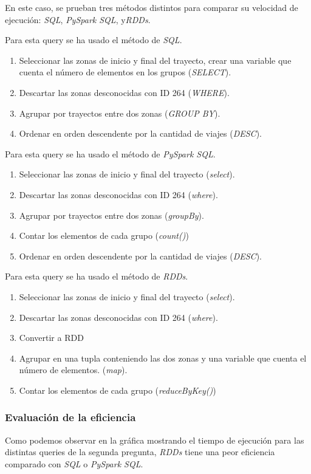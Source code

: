En este caso, se prueban tres métodos distintos para comparar su velocidad de ejecución: \textit{SQL}, \textit{ PySpark SQL}, y\textit{RDDs}.

Para esta query se ha usado el método de \textit{SQL}. 
\begin{enumerate}
  \item Seleccionar las zonas de inicio y final del trayecto, crear una variable que cuenta el número de elementos en los grupos (\textit{SELECT}).
  \item Descartar las zonas desconocidas con ID 264 (\textit{WHERE}).
  \item Agrupar por trayectos entre dos zonas (\textit{GROUP BY}).
  \item Ordenar en orden descendente por la cantidad de viajes (\textit{DESC}).
\end{enumerate}

Para esta query se ha usado el método de \textit{PySpark SQL}. 
\begin{enumerate}
  \item Seleccionar las zonas de inicio y final del trayecto (\textit{select}).
  \item Descartar las zonas desconocidas con ID 264 (\textit{where}).
  \item Agrupar por trayectos entre dos zonas (\textit{groupBy}).
  \item Contar los elementos de cada grupo (\textit{count()})
  \item Ordenar en orden descendente por la cantidad de viajes (\textit{DESC}).
\end{enumerate}

Para esta query se ha usado el método de \textit{RDDs}. 
\begin{enumerate}
  \item Seleccionar las zonas de inicio y final del trayecto (\textit{select}).
  \item Descartar las zonas desconocidas con ID 264 (\textit{where}).
  \item Convertir a RDD
  \item Agrupar en una tupla conteniendo las dos zonas y una variable que cuenta el número de elementos. (\textit{map}).
  \item Contar los elementos de cada grupo (\textit{reduceByKey()})
\end{enumerate}


\subsubsection*{Evaluación de la eficiencia}
Como podemos observar en la gráfica mostrando el tiempo de ejecución para las distintas queries de la segunda pregunta, \textit{RDDs} tiene una peor eficiencia comparado con \textit{SQL} o \textit{PySpark SQL}.

